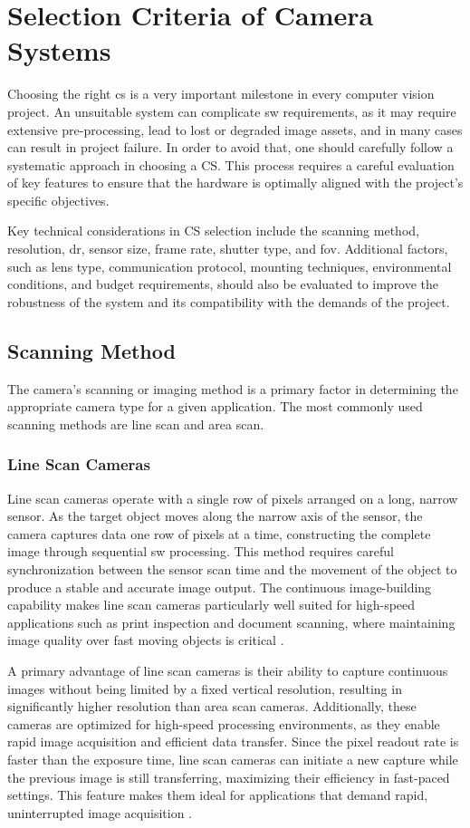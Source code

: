 \section{Selection Criteria of Camera Systems}
Choosing the right \gls{cs} is a very important milestone in every computer vision project. An unsuitable system can complicate \gls{sw} requirements, as it may require extensive pre-processing, lead to lost or degraded image assets, and in many cases can result in project failure. In order to avoid that, one should carefully follow a systematic approach in choosing a CS. This process requires a careful evaluation of key features to ensure that the hardware is optimally aligned with the project’s specific objectives.

Key technical considerations in CS selection include the scanning method, resolution, \gls{dr}, sensor size, frame rate, shutter type, and \gls{fov}. Additional factors, such as lens type, communication protocol, mounting techniques, environmental conditions, and budget requirements, should also be evaluated to improve the robustness of the system and its compatibility with the demands of the project.

\subsection{Scanning Method}
The camera's scanning or imaging method is a primary factor in determining the appropriate camera type for a given application. The most commonly used scanning methods are line scan and area scan.

\subsubsection{Line Scan Cameras}
Line scan cameras operate with a single row of pixels arranged on a long, narrow sensor. As the target object moves along the narrow axis of the sensor, the camera captures data one row of pixels at a time, constructing the complete image through sequential \gls{sw} processing. This method requires careful synchronization between the sensor scan time and the movement of the object to produce a stable and accurate image output. The continuous image-building capability makes line scan cameras particularly well suited for high-speed applications such as print inspection and document scanning, where maintaining image quality over fast moving objects is critical \cite{AS_VS_LS_ART}.

A primary advantage of line scan cameras is their ability to capture continuous images without being limited by a fixed vertical resolution, resulting in significantly higher resolution than area scan cameras. Additionally, these cameras are optimized for high-speed processing environments, as they enable rapid image acquisition and efficient data transfer. Since the pixel readout rate is faster than the exposure time, line scan cameras can initiate a new capture while the previous image is still transferring, maximizing their efficiency in fast-paced settings. This feature makes them ideal for applications that demand rapid, uninterrupted image acquisition \cite{AS_VS_LS_ART}.

